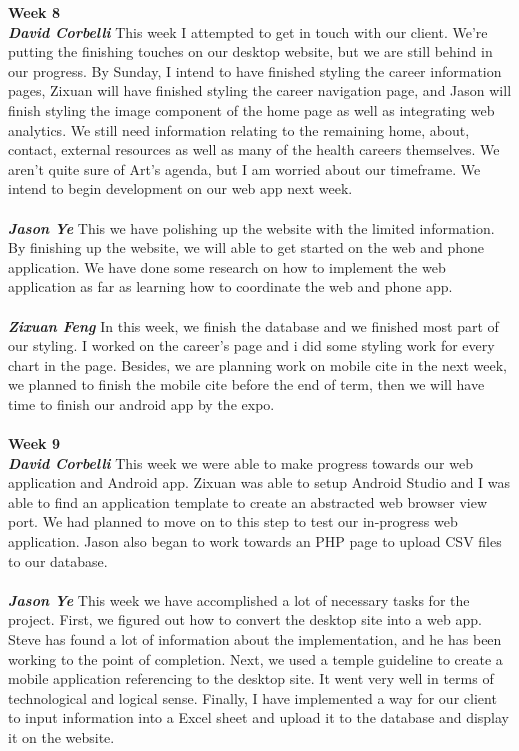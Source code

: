 \documentclass[onecolumn, draftclsnofoot,10pt, compsoc]{IEEEtran}
\begin{document}
\textbf{Week 8}
\\ \textbf{\textit{David Corbelli}}
This week I attempted to get in touch with our client. We're putting the finishing touches on our desktop website, but we are still behind in our progress. By Sunday, I intend to have finished styling the career information pages, Zixuan will have finished styling the career navigation page, and Jason will finish styling the image component of the home page as well as integrating web analytics. We still need information relating to the remaining home, about, contact, external resources as well as many of the health careers themselves. We aren't quite sure of Art's agenda, but I am worried about our timeframe. We intend to begin development on our web app next week.\\ \\
\textbf{\textit{Jason Ye}}
This we have polishing up the website with the limited information. By finishing up the website, we will able to get started on the web and phone application. We have done some research on how to implement the web application as far as learning how to coordinate the web and phone app.\\ \\
\textbf{\textit{Zixuan Feng}}
In this week, we finish the database and we finished most part of our styling. I worked on the career's page and i did some styling work for every chart in the page. Besides, we are planning work on mobile cite in the next week, we planned to finish the mobile cite before the end of term, then we will have time to finish our android app by the expo.\\ \\
\textbf{Week 9}
\\ \textbf{\textit{David Corbelli}}
This week we were able to make progress towards our web application and Android app. Zixuan was able to setup Android Studio and I was able to find an application template to create an abstracted web browser view port. We had planned to move on to this step to test our in-progress web application. Jason also began to work towards an PHP page to upload CSV files to our database.\\ \\
\textbf{\textit{Jason Ye}}
This week we have accomplished a lot of necessary tasks for the project. First, we figured out how to convert the desktop site into a web app. Steve has found a lot of information about the implementation, and he has been working to the point of completion. Next, we used a temple guideline to create a mobile application referencing to the desktop site. It went very well in terms of technological and logical sense. Finally, I have implemented a way for our client to input information into a Excel sheet and upload it to the database and display it on the website.\\ \\
\end{document}

